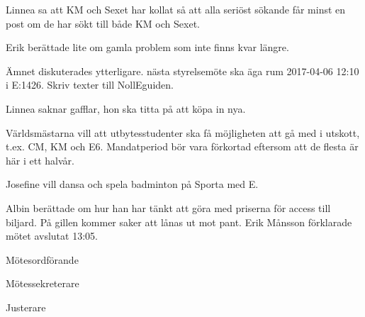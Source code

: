 \documentclass[10pt]{article}
\def\mo{Erik Månsson}
\def\ms{Johan Karlberg}
\def\ji{Linnea Sjödahl}
\begin{document}
\begin{paragrafer}
Linnea sa att KM och Sexet har kollat så att alla seriöst sökande får minst en post om de har sökt till både KM och Sexet.

Erik berättade lite om gamla problem som inte finns kvar längre.

Ämnet diskuterades ytterligare.
{\Mba} nästa styrelsemöte ska äga rum 2017-04-06 12:10 i E:1426.
{\Ibfu}
Skriv texter till NollEguiden.

Linnea saknar gafflar, hon ska titta på att köpa in nya.

Världsmästarna vill att utbytesstudenter ska få möjligheten att gå med i utskott, t.ex. CM, KM och E6. Mandatperiod bör vara förkortad eftersom att de flesta är här i ett halvår.

Josefine vill dansa och spela badminton på Sporta med E.

Albin berättade om hur han har tänkt att göra med priserna för access till biljard. På gillen kommer saker att lånas ut mot pant.
{\mo} förklarade mötet avslutat 13:05.

\end{paragrafer}

\newpage
\hidesignfoot
\begin{signatures}{3}
\signature{\mo}{Mötesordförande}
\signature{\ms}{Mötessekreterare}
\signature{\ji}{Justerare}
\end{signatures}
\end{document}

